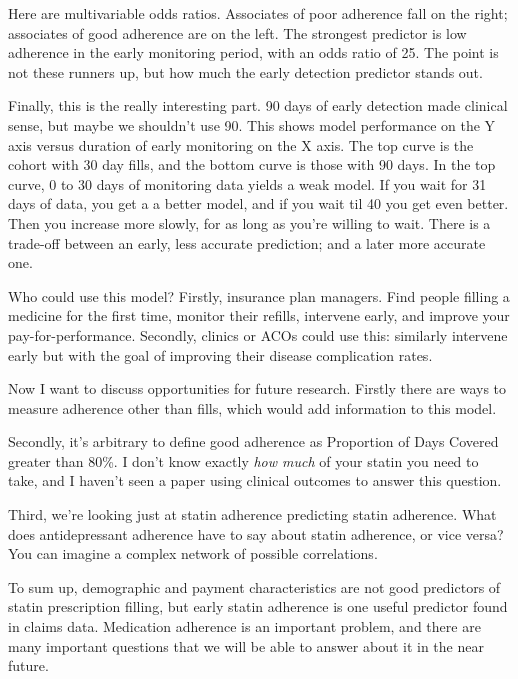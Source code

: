 \documentclass[12pt]{report}
\begin{document}
\begin{large}

Here are multivariable odds ratios. Associates of poor adherence fall
on the right; associates of good adherence are on the left. The
strongest predictor is low adherence in the early monitoring period,
with an odds ratio of 25. The point is not these runners up, but how
much the early detection predictor stands out. %

Finally, this is the really interesting part. 90 days of early
detection made clinical sense, but maybe we shouldn't use 90. This
shows model performance on the Y axis versus duration of early
monitoring on the X axis. The top curve is the cohort with 30 day
fills, and the bottom curve is those with 90 days. In the top curve, 0
to 30 days of monitoring data yields a weak model. If you wait for 31
days of data, you get a a better model, and if you wait til 40 you get
even better. Then you increase more slowly, for as long as you're
willing to wait. There is a trade-off between an early, less accurate
prediction; and a later more accurate one. %

Who could use this model? Firstly, insurance plan managers. Find
people filling a medicine for the first time, monitor their refills,
intervene early, and improve your pay-for-performance. Secondly,
clinics or ACOs could use this: similarly intervene early but with the
goal of improving their disease complication rates. %

Now I want to discuss opportunities for future research. First\-ly there
are ways to measure adherence other than fills, which would add
information to this model.

Secondly, it's arbitrary to define good adherence as Proportion of
Days Covered greater than 80\%. I don't know exactly \emph{how much}
of your statin you need to take, and I haven't seen a paper using
clinical outcomes to answer this question.

Third, we're looking just at statin adherence predicting statin
adherence. What does antidepressant adherence have to say about statin
adherence, or vice versa? You can imagine a complex network of
possible correlations.

To sum up, demographic and payment characteristics are not good
predictors of statin prescription filling, but early statin adherence
is one useful predictor found in claims data. Medication adherence is
an important problem, and there are many important questions that we
will be able to answer about it in the near future.



\end{large}
\end{document}
